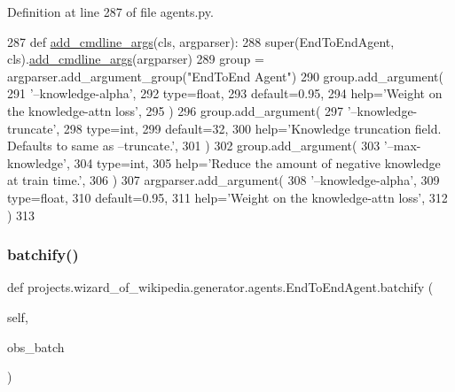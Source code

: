 Definition at line 287 of file agents.\+py.


\begin{DoxyCode}
287     \textcolor{keyword}{def }\hyperlink{namespaceparlai_1_1agents_1_1drqa_1_1config_a62fdd5554f1da6be0cba185271058320}{add\_cmdline\_args}(cls, argparser):
288         super(EndToEndAgent, cls).\hyperlink{namespaceparlai_1_1agents_1_1drqa_1_1config_a62fdd5554f1da6be0cba185271058320}{add\_cmdline\_args}(argparser)
289         group = argparser.add\_argument\_group(\textcolor{stringliteral}{"EndToEnd Agent"})
290         group.add\_argument(
291             \textcolor{stringliteral}{'--knowledge-alpha'},
292             type=float,
293             default=0.95,
294             help=\textcolor{stringliteral}{'Weight on the knowledge-attn loss'},
295         )
296         group.add\_argument(
297             \textcolor{stringliteral}{'--knowledge-truncate'},
298             type=int,
299             default=32,
300             help=\textcolor{stringliteral}{'Knowledge truncation field. Defaults to same as --truncate.'},
301         )
302         group.add\_argument(
303             \textcolor{stringliteral}{'--max-knowledge'},
304             type=int,
305             help=\textcolor{stringliteral}{'Reduce the amount of negative knowledge at train time.'},
306         )
307         argparser.add\_argument(
308             \textcolor{stringliteral}{'--knowledge-alpha'},
309             type=float,
310             default=0.95,
311             help=\textcolor{stringliteral}{'Weight on the knowledge-attn loss'},
312         )
313 
\end{DoxyCode}
\mbox{\label{classprojects_1_1wizard__of__wikipedia_1_1generator_1_1agents_1_1EndToEndAgent_a66886694fb06a243c783d2b7902b46bb}} 
\subsubsection{\texorpdfstring{batchify()}{batchify()}}
{\footnotesize\ttfamily def projects.\+wizard\+\_\+of\+\_\+wikipedia.\+generator.\+agents.\+End\+To\+End\+Agent.\+batchify (\begin{DoxyParamCaption}\item[{}]{self,  }\item[{}]{obs\+\_\+batch }\end{DoxyParamCaption})}


